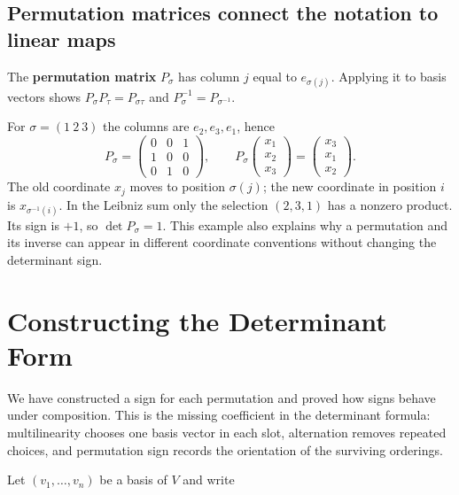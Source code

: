 \subsection{Permutation matrices connect the notation to linear maps}
The \textbf{permutation matrix} $P_\sigma$ has column $j$ equal to
$e_{\sigma(j)}$. Applying it to basis vectors shows
$P_\sigma P_\tau=P_{\sigma\tau}$ and $P_\sigma^{-1}=P_{\sigma^{-1}}$.

\begin{example}
For $\sigma=(1\ 2\ 3)$ the columns are $e_2,e_3,e_1$, hence
\[
P_\sigma=\begin{pmatrix}0&0&1\\1&0&0\\0&1&0\end{pmatrix},\qquad
P_\sigma\begin{pmatrix}x_1\\x_2\\x_3\end{pmatrix}
=\begin{pmatrix}x_3\\x_1\\x_2\end{pmatrix}.
\]
The old coordinate $x_j$ moves to position $\sigma(j)$; the new
coordinate in position $i$ is $x_{\sigma^{-1}(i)}$.
In the Leibniz sum only the selection $(2,3,1)$ has a nonzero product.
Its sign is $+1$, so $\det P_\sigma=1$. This example also explains
why a permutation and its inverse can appear in different coordinate
conventions without changing the determinant sign.
\end{example}
\section{Constructing the Determinant Form}

We have constructed a sign for each permutation and proved how signs
behave under composition. This is the missing coefficient in the
determinant formula: multilinearity chooses one basis vector in each slot,
alternation removes repeated choices, and permutation sign records the
orientation of the surviving orderings.

Let $(v_1,\ldots,v_n)$ be a basis of $V$ and write

